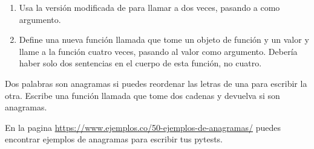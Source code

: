 \begin{ejercicio}
\begin{enumerate}
\item Usa la versión modificada de  para llamar a
 dos veces, pasando a  como argumento.

\item Define una nueva función llamada
 que tome un objeto de función y un valor
y llame a la función cuatro veces, pasando al valor
como argumento.  Debería haber solo
dos sentencias en el cuerpo de esta función, no cuatro.

\end{enumerate}


\end{ejercicio}

\begin{ejercicio}
\label{anagram}
%
Dos palabras son anagramas si puedes reordenar las letras de una
para escribir la otra.  Escribe una función llamada 
que tome dos cadenas y devuelva  si son anagramas.

En la pagina \url{https://www.ejemplos.co/50-ejemplos-de-anagramas/} puedes encontrar ejemplos de anagramas para escribir tus pytests.


\end{ejercicio}

